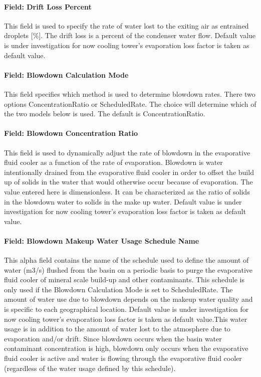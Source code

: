 \paragraph{Field: Drift Loss Percent}\label{field-drift-loss-percent-4}

This field is used to specify the rate of water lost to the exiting air as entrained droplets {[}\%{]}. The drift loss is a percent of the condenser water flow. Default value is under investigation for now cooling tower's evaporation loss factor is taken as default value.

\paragraph{Field: Blowdown Calculation Mode}\label{field-blowdown-calculation-mode-4}

This field specifies which method is used to determine blowdown rates. There two options ConcentrationRatio or ScheduledRate. The choice will determine which of the two models below is used. The default is ConcentrationRatio.

\paragraph{Field: Blowdown Concentration Ratio}\label{field-blowdown-concentration-ratio-4}

This field is used to dynamically adjust the rate of blowdown in the evaporative fluid cooler as a function of the rate of evaporation. Blowdown is water intentionally drained from the evaporative fluid cooler in order to offset the build up of solids in the water that would otherwise occur because of evaporation. The value entered here is dimensionless. It can be characterized as the ratio of solids in the blowdown water to solids in the make up water. Default value is under investigation for now cooling tower's evaporation loss factor is taken as default value.

\paragraph{Field: Blowdown Makeup Water Usage Schedule Name}\label{field-blowdown-makeup-water-usage-schedule-name-4}

This alpha field contains the name of the schedule used to define the amount of water (m3/s) flushed from the basin on a periodic basis to purge the evaporative fluid cooler of mineral scale build-up and other contaminants. This schedule is only used if the Blowdown Calculation Mode is set to ScheduledRate. The amount of water use due to blowdown depends on the makeup water quality and is specific to each geographical location. Default value is under investigation for now cooling tower's evaporation loss factor is taken as default value.This water usage is in addition to the amount of water lost to the atmosphere due to evaporation and/or drift. Since blowdown occurs when the basin water contaminant concentration is high, blowdown only occurs when the evaporative fluid cooler is active and water is flowing through the evaporative fluid cooler (regardless of the water usage defined by this schedule).


